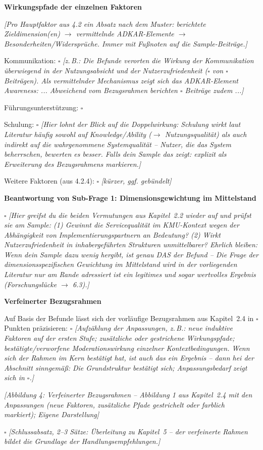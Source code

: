 \textbf{Wirkungspfade der einzelnen Faktoren}

\textit{[Pro Hauptfaktor aus 4.2 ein Absatz nach dem Muster: berichtete Zieldimension(en) $\rightarrow$ vermittelnde ADKAR-Elemente $\rightarrow$ Besonderheiten/Widerspr\"uche. Immer mit Fu\ss{}noten auf die Sample-Beitr\"age.]}

Kommunikation: $\square$ \textit{[z.\,B.: Die Befunde verorten die Wirkung der Kommunikation \"uberwiegend in der Nutzungsabsicht und der Nutzerzufriedenheit ($\square$ von $\square$ Beitr\"agen). Als vermittelnder Mechanismus zeigt sich das ADKAR-Element Awareness: ... Abweichend vom Bezugsrahmen berichten $\square$ Beitr\"age zudem ...]}

F\"uhrungsunterst\"utzung: $\square$

Schulung: $\square$ \textit{[Hier lohnt der Blick auf die Doppelwirkung: Schulung wirkt laut Literatur h\"aufig sowohl auf Knowledge/Ability ($\rightarrow$ Nutzungsqualit\"at) als auch indirekt auf die wahrgenommene Systemqualit\"at -- Nutzer, die das System beherrschen, bewerten es besser. Falls dein Sample das zeigt: explizit als Erweiterung des Bezugsrahmens markieren.]}

Weitere Faktoren (aus 4.2.4): $\square$ \textit{[k\"urzer, ggf. geb\"undelt]}

\textbf{Beantwortung von Sub-Frage 1: Dimensionsgewichtung im Mittelstand}

$\square$ \textit{[Hier greifst du die beiden Vermutungen aus Kapitel~2.2 wieder auf und pr\"ufst sie am Sample: (1) Gewinnt die Servicequalit\"at im KMU-Kontext wegen der Abh\"angigkeit von Implementierungspartnern an Bedeutung? (2) Wirkt Nutzerzufriedenheit in inhabergef\"uhrten Strukturen unmittelbarer? Ehrlich bleiben: Wenn dein Sample dazu wenig hergibt, ist genau DAS der Befund -- Die Frage der dimensionsspezifischen Gewichtung im Mittelstand wird in der vorliegenden Literatur nur am Rande adressiert ist ein legitimes und sogar wertvolles Ergebnis (Forschungsl\"ucke $\rightarrow$ 6.3).]}

\textbf{Verfeinerter Bezugsrahmen}

Auf Basis der Befunde l\"asst sich der vorl\"aufige Bezugsrahmen aus Kapitel~2.4 in $\square$ Punkten pr\"azisieren: $\square$ \textit{[Aufz\"ahlung der Anpassungen, z.\,B.: neue induktive Faktoren auf der ersten Stufe; zus\"atzliche oder gestrichene Wirkungspfade; best\"atigte/verworfene Moderationswirkung einzelner Kontextbedingungen. Wenn sich der Rahmen im Kern best\"atigt hat, ist auch das ein Ergebnis -- dann hei\sst{} der Abschnitt sinngem\"a\ss{}: Die Grundstruktur best\"atigt sich; Anpassungsbedarf zeigt sich in $\square$.]}

\textit{[Abbildung 4: Verfeinerter Bezugsrahmen -- Abbildung 1 aus Kapitel~2.4 mit den Anpassungen (neue Faktoren, zus\"atzliche Pfade gestrichelt oder farblich markiert); Eigene Darstellung]}

$\square$ \textit{[Schlussabsatz, 2--3 S\"atze: \"Uberleitung zu Kapitel~5 -- der verfeinerte Rahmen bildet die Grundlage der Handlungsempfehlungen.]}

